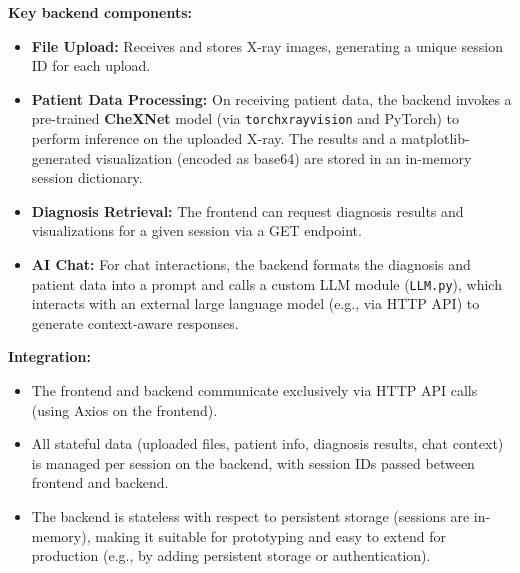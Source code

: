 \documentclass[twocolumn]{article}
\begin{document}
\textbf{Key backend components:}
\begin{itemize}[leftmargin=2em]
    \item \textbf{File Upload:} Receives and stores X-ray images, generating a unique session ID for each upload.
    \item \textbf{Patient Data Processing:} On receiving patient data, the backend invokes a pre-trained \textbf{CheXNet} model (via \texttt{torchxrayvision} and PyTorch) to perform inference on the uploaded X-ray. The results and a matplotlib-generated visualization (encoded as base64) are stored in an in-memory session dictionary.
    \item \textbf{Diagnosis Retrieval:} The frontend can request diagnosis results and visualizations for a given session via a GET endpoint.
    \item \textbf{AI Chat:} For chat interactions, the backend formats the diagnosis and patient data into a prompt and calls a custom LLM module (\texttt{LLM.py}), which interacts with an external large language model (e.g., via HTTP API) to generate context-aware responses.
\end{itemize}

\textbf{Integration:}
\begin{itemize}[leftmargin=2em]
    \item The frontend and backend communicate exclusively via HTTP API calls (using Axios on the frontend).
    \item All stateful data (uploaded files, patient info, diagnosis results, chat context) is managed per session on the backend, with session IDs passed between frontend and backend.
    \item The backend is stateless with respect to persistent storage (sessions are in-memory), making it suitable for prototyping and easy to extend for production (e.g., by adding persistent storage or authentication).
\end{itemize}

\end{document}
